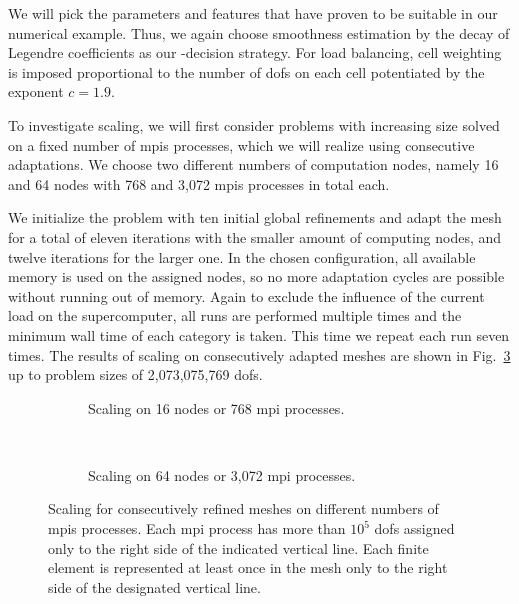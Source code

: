 We will pick the parameters and features that have proven to be suitable in our numerical example. Thus, we again choose smoothness estimation by the decay of Legendre coefficients as our \hp-decision strategy. For load balancing, cell weighting is imposed proportional to the number of \glspl{dof} on each cell potentiated by the exponent $c = 1.9$.



To investigate scaling, we will first consider problems with increasing size solved on a fixed number of \glspl{mpi} processes, which we will realize using consecutive adaptations. We choose two different numbers of computation nodes, namely 16 and 64 nodes with 768 and 3,072 \glspl{mpi} processes in total each.

We initialize the problem with ten initial global refinements and adapt the mesh for a total of eleven iterations with the smaller amount of computing nodes, and twelve iterations for the larger one. In the chosen configuration, all available memory is used on the assigned nodes, so no more adaptation cycles are possible without running out of memory. Again to exclude the influence of the current load on the supercomputer, all runs are performed multiple times and the minimum wall time of each category is taken. This time we repeat each run seven times. The results of scaling on consecutively adapted meshes are shown in Fig.~\ref{fig:size} up to problem sizes of 2,073,075,769 \glspl{dof}.

\begin{figure}
\begin{subfigure}{1\textwidth}
  \centering
  
  \caption{Scaling on 16 nodes or 768 \gls{mpi} processes.}
  \label{fig:size-nodes16}
\end{subfigure} \\
\vspace{1em}
\begin{subfigure}{1\textwidth}
  \centering
  
  \caption{Scaling on 64 nodes or 3,072 \gls{mpi} processes.}
  \label{fig:size-nodes64}
\end{subfigure}
\vspace{-1em}
\caption[Scaling for consecutively refined meshes on different numbers of  processes.]{Scaling for consecutively refined meshes on different numbers of \glspl{mpi} processes. Each \gls{mpi} process has more than $10^5$ \glspl{dof} assigned only to the right side of the indicated vertical line. Each finite element is represented at least once in the mesh only to the right side of the designated vertical line.}
\label{fig:size}
\end{figure}

